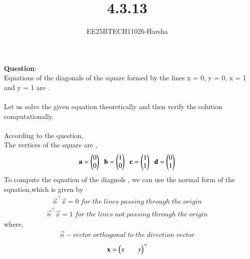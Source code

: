 \documentclass[journal]{IEEEtran}
\begin{document}

\vspace{3cm}

\title{4.3.13}
\author{EE25BTECH11026-Harsha}
 \maketitle
{\let\newpage\relax\maketitle}

\renewcommand{\thefigure}{\theenumi}
\renewcommand{\thetable}{\theenumi}
\setlength{\intextsep}{10pt} %


\renewcommand{\thetable}{\theenumi}

\textbf{Question}:\\
Equations of the diagonals of the square formed by the lines x = 0, y = 0, x = 1 and y = 1 are \underline{\hspace{2cm}}.\\
\solution \\
Let us solve the given equation theoretically and then verify the solution computationally.\\
\\
According to the question,\\
The vertices of the square are ,
\begin{align}
    \mathbf{a}=\begin{pmatrix}0\\0\end{pmatrix}\;\;\mathbf{b}=\begin{pmatrix}1\\0\end{pmatrix}\;\;\mathbf{c}=\begin{pmatrix}1\\1\end{pmatrix}\;\;\mathbf{d}=\begin{pmatrix}0\\1\end{pmatrix}
\end{align}
To compute the equation of the diagnols , we can use the normal form of the equation,which is given by
\begin{align}
    \vec{n}^{\top}\vec{x}=0 \;for \;the \;lines \;passing\;through \;the \;origin
\end{align}
\begin{align}
    \vec{n}^{\top}\vec{x}=1 \;for \;the \;lines \;not \;passing\;through \;the \;origin
\end{align}
where,\\
\begin{align}
    \vec{n}-vector\; orthogonal\; to\; the\; direction\; vector
\end{align}
\begin{align}
    \mathbf{x}=\begin{pmatrix}x&&y\end{pmatrix}^{\top}
\end{align}
\end{document}
